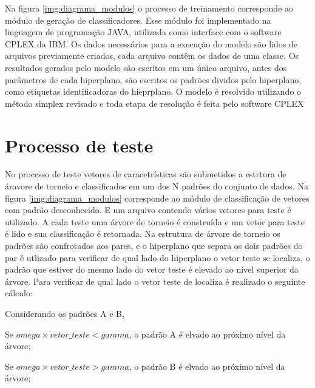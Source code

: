 Na figura \ref{img:diagrama_modulos} o processo de treinamento corresponde ao módulo de geração de classificadores. Esse módulo foi implementado na linguagem de programação JAVA, utilizada como interface com o software CPLEX da IBM. Os dados necessários para a execução do modelo são lidos de arquivos previamente criados, cada arquivo contêm os dados de uma classe. Os resultados gerados pelo modelo são escritos em um único arquivo, antes dos parâmetros de cada hiperplano, são escritos os padrões dividos pelo hiperplano, como etiquetas identificadoras do hieprplano.
O modelo é resolvido utilizando o método simplex revisado e toda etapa de resolução é feita pelo software CPLEX

\section{Processo de teste}
No processo de teste vetores de caracetrísticas são submetidos a estrtura de áravore de torneio e classificados em um dos N padrões do conjunto de dados.
Na figura \ref{img:diagrama_modulos} corresponde ao módulo de classificação de vetores com padrão desconhecido. E um arquivo contendo vários vetores para teste é utilizado.  A cada teste uma árvore de torneio é construída e um vetor para teste é lido e sua classificação é retornada. Na estrutura de árvore de torneio os padrões são confrotados aos pares, e o hiperplano que separa os dois padrões do par é utlizado para verificar de qual lado do hiperplano o vetor teste se localiza, o padrão que estiver do mesmo lado do vetor teste é elevado ao nível superior da árvore. Para verificar de qual lado o vetor teste de localiza é realizado o seguinte cálculo:

Considerando os padrões A e B, 

Se $ omega \times vetor\_teste < gamma$, o padrão A é elvado ao próximo nível da árvore;

Se $ omega \times vetor\_teste > gamma$, o padrão B é elvado ao próximo nível da árvore; 

